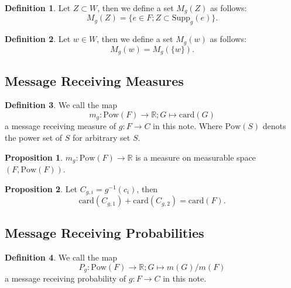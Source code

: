 \documentclass[11pt, a4note]{article}
\theoremstyle{definition}
\newtheorem{definition}{Definition}[section]
\newtheorem{proposition}{Proposition}[section]
\begin{document}
\begin{definition}
Let $ Z \subset W $, then we define a set $ M_{g}(Z) $ as follows:
\begin{equation}
M_{g}(Z) = \{e \in F ; Z \subset \mathrm{Supp}_{g}(e)\}.
\end{equation}
\end{definition}

\begin{definition}
Let $ w \in W $, then we define a set $ M_{g}(w) $ as follows:
\begin{equation}
M_{g}(w) = M_{g}(\{w\}).
\end{equation}
\end{definition}

\subsection{Message Receiving Measures}

\begin{definition}
We call the map
\begin{equation}
m_{g} : \mathrm{Pow}(F) \to \mathbb{R} ; G \mapsto \mathrm{card}(G)
\end{equation}
a message receiving measure of $ g : F \to C $ in this note.
Where $ \mathrm{Pow}(S) $ denots the power set of $ S $ for arbitrary set $ S $.
\end{definition}

\begin{proposition}
$ m_{g} : \mathrm{Pow}(F) \to \mathbb{R} $ is a measure on measurable space $ (F, \mathrm{Pow}(F)) $.
\end{proposition}

\begin{proposition}
Let $ C_{g,i} = g^{-1}(c_{i}) $, then
\begin{equation}
\mathrm{card}(C_{g,1}) + \mathrm{card}(C_{g,2}) = \mathrm{card}(F).
\end{equation}
\end{proposition}

\subsection{Message Receiving Probabilities}

\begin{definition}
We call the map
\begin{equation}
P_{g} : \mathrm{Pow}(F) \to \mathbb{R} ; G \mapsto m(G)/m(F)
\end{equation}
a message receiving probability of $ g : F \to C $ in this note.
\end{definition}
\end{document}
